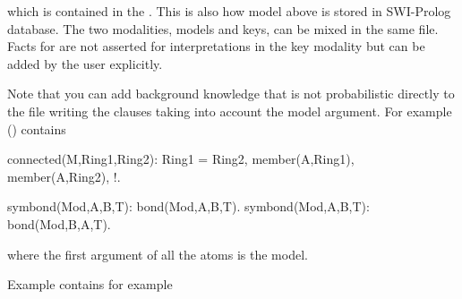 \documentclass[letterpaper,10pt,english]{sphinxmanual}
\begin{document}
\begin{sphinxVerbatim}[commandchars=\\\{\}]
\end{sphinxVerbatim}

which is contained in the .
This is also how model  above is stored in SWI-Prolog database.
The two modalities, models and keys, can be mixed in the same file.
Facts for  are not asserted for interpretations in the key modality but can be added by the user explicitly.

Note that you can add background knowledge that is not probabilistic directly to the file writing the clauses taking into account the model argument.
For example () contains

\begin{sphinxVerbatim}[commandchars=\\\{\}]
connected(\PYGZus{}M,Ring1,Ring2):\PYGZhy{}
        Ring1 \PYGZbs{}= Ring2,
        member(A,Ring1),
        member(A,Ring2), !.

symbond(Mod,A,B,T):\PYGZhy{} bond(Mod,A,B,T).
symbond(Mod,A,B,T):\PYGZhy{} bond(Mod,B,A,T).
\end{sphinxVerbatim}

where the first argument of all the atoms is the model.

Example  contains for example
\end{document}
